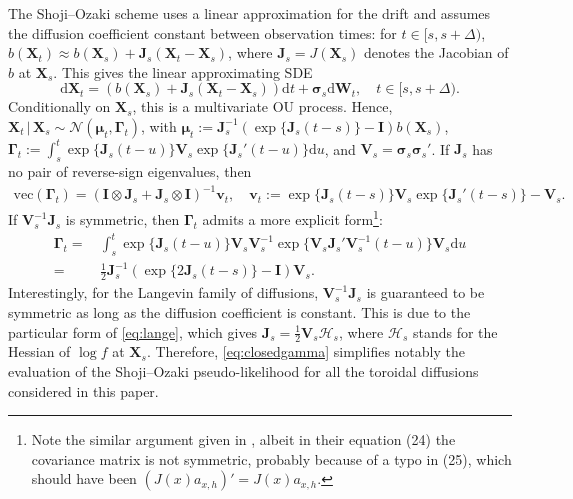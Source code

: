 \documentclass[oneside,11pt]{article}
\newcommand{\rd}{\mathrm{d}}
\newcommand{\bX}{\mathbf{X}}
\newcommand{\bJ}{\mathbf{J}}
\newcommand{\bmu}{\boldsymbol\mu}
\newcommand{\bv}{\mathbf{v}}
\newcommand{\bsigma}{\boldsymbol\sigma}
\newcommand{\bGamma}{\boldsymbol\Gamma}
\newcommand{\bHcal}{\boldsymbol{\mathcal{H}}}
\newcommand{\bV}{\mathbf{V}}
\newcommand{\bI}{\mathbf{I}}
\newcommand{\bW}{\mathbf{W}}
\newcommand{\vect}[1]{\mathrm{vec}\left(#1\right)}
\begin{document}
The Shoji--Ozaki \citep{Shoji1998} scheme uses a linear approximation for the drift and assumes
the diffusion coefficient constant between observation times: for $t\in[s, s + \Delta)$, $b(\bX_t)\approx b(\bX_s)+\bJ_s(\bX_t-\bX_s)$, where
$\bJ_s=J(\bX_s)$ denotes the Jacobian of $b$ at
$\bX_s$. This gives the linear
approximating SDE
\[
\rd \bX_t=(b(\bX_s)+\bJ_s(\bX_t-\bX_s))\rd t+\bsigma_s\rd \bW_t,\quad
t\in[s,s+\Delta).
\]
Conditionally on $\bX_s$, this is a multivariate OU
process. Hence, $\bX_t\,|\,\bX_s\sim\mathcal{N}(\bmu_t,\bGamma_t)$, with $\bmu_t:=\bJ_s^{-1}(\exp\{\bJ_s(t-s)\}-\bI)b(\bX_s)$,
$\bGamma_t:=\int_s^t\exp\{\bJ_s(t-u)\}\bV_s\exp\{\bJ_s'(t-u)\}\rd u$, and $\bV_s=\bsigma_s\bsigma_s'$. If $\bJ_s$ has no pair of reverse-sign eigenvalues, then
\begin{align}
\vect{\bGamma_t}=(\bI\otimes\bJ_s+\bJ_s\otimes\bI)^{-1}\bv_t,\quad  \bv_t:=\exp\{\bJ_s(t-s)\}\bV_s\exp\{\bJ_s'(t-s)\}-\bV_s.\label{eq:gamma}
\end{align}
If $\bV_s^{-1}\bJ_s$ is symmetric, then $\bGamma_t$ admits a more
explicit form\footnote{Note the similar argument given in
  \cite{Roberts2002}, albeit in their equation (24) the covariance
  matrix is not symmetric, probably because of a typo in (25), which should have been
  $(J(x)a_{x,h})'=J(x)a_{x,h}$.}:
\begin{align}
\bGamma_t=&\,\int_s^t \exp\{\bJ_s(t-u)\}\bV_s
 \bV_s^{-1} \exp\{\bV_s\bJ_s'\bV_s^{-1}(t-u)\}\bV_s\rd u\nonumber\\
=&\,\frac{1}{2}\bJ_s^{-1}(\exp\{2\bJ_s(t-s)\}-\bI)\bV_s.\label{eq:closedgamma}
\end{align}
Interestingly, for the Langevin family of diffusions, $\bV_s^{-1}\bJ_s$
is guaranteed to be symmetric as long as the diffusion coefficient is
constant. This is due to the particular form of \eqref{eq:lange}, which
gives $\bJ_s = \frac{1}{2}\bV_s \bHcal_s$, where $\bHcal_s$ stands for
the Hessian of $\log f$ at $\bX_s$. Therefore, \eqref{eq:closedgamma}
simplifies notably the evaluation of the Shoji--Ozaki pseudo-likelihood
for all the toroidal diffusions considered in this paper. \\
\end{document}
